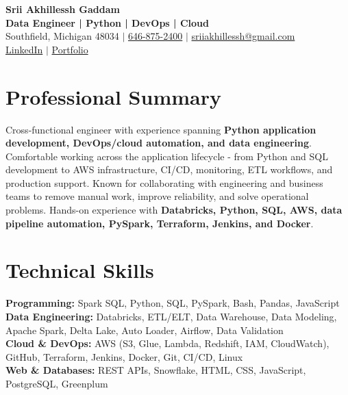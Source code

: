 \documentclass[letterpaper,10pt]{article}
\begin{document}
\fontsize{9.35pt}{10.45pt}\selectfont

\begin{center}
    {\LARGE \textbf{Srii Akhillessh Gaddam}} \\[-1pt]
    \textbf{Data Engineer | Python | DevOps | Cloud} \\[2pt]
    Southfield, Michigan 48034 $|$
    \href{tel:6468752400}{646-875-2400} $|$
    \href{mailto:sriiakhillessh@gmail.com}{sriiakhillessh@gmail.com} \\[1pt]
    \href{https://www.linkedin.com/in/srii-akhiilessh-gaddam-b48668191/}{LinkedIn} $|$
    \href{https://sriiakhillesshg.github.io/portfolio/}{Portfolio}
\end{center}
\vspace{-8pt}

\section{Professional Summary}
\small{Cross-functional engineer with experience spanning \textbf{Python application development, DevOps/cloud automation, and data engineering}. Comfortable working across the application lifecycle - from Python and SQL development to AWS infrastructure, CI/CD, monitoring, ETL workflows, and production support. Known for collaborating with engineering and business teams to remove manual work, improve reliability, and solve operational problems. Hands-on experience with \textbf{Databricks, Python, SQL, AWS, data pipeline automation, PySpark, Terraform, Jenkins, and Docker}.}

\section{Technical Skills}
\small{
\textbf{Programming:} Spark SQL, Python, SQL, PySpark, Bash, Pandas, JavaScript \\
\textbf{Data Engineering:} Databricks, ETL/ELT, Data Warehouse, Data Modeling, Apache Spark, Delta Lake, Auto Loader, Airflow, Data Validation \\
\textbf{Cloud \& DevOps:} AWS (S3, Glue, Lambda, Redshift, IAM, CloudWatch), GitHub, Terraform, Jenkins, Docker, Git, CI/CD, Linux \\
\textbf{Web \& Databases:} REST APIs, Snowflake, HTML, CSS, JavaScript, PostgreSQL, Greenplum
}
\end{document}
